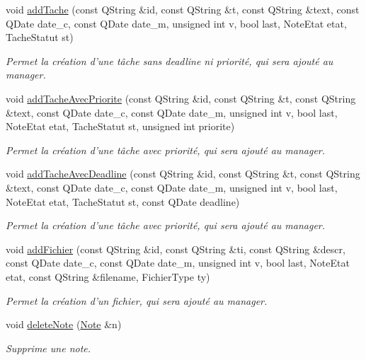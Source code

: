 \begin{DoxyCompactItemize}
void \hyperlink{class_notes_manager_a6fd74614ecebdd7ca8c62abce57ed09b}{add\-Tache} (const Q\-String \&id, const Q\-String \&t, const Q\-String \&text, const Q\-Date date\-\_\-c, const Q\-Date date\-\_\-m, unsigned int v, bool last, Note\-Etat etat, Tache\-Statut st)
\begin{DoxyCompactList}\small\item\em Permet la création d'une tâche sans deadline ni priorité, qui sera ajouté au manager. \end{DoxyCompactList}\item 
void \hyperlink{class_notes_manager_ad4826ba011a506bf26d2cfc10b5d6669}{add\-Tache\-Avec\-Priorite} (const Q\-String \&id, const Q\-String \&t, const Q\-String \&text, const Q\-Date date\-\_\-c, const Q\-Date date\-\_\-m, unsigned int v, bool last, Note\-Etat etat, Tache\-Statut st, unsigned int priorite)
\begin{DoxyCompactList}\small\item\em Permet la création d'une tâche avec priorité, qui sera ajouté au manager. \end{DoxyCompactList}\item 
void \hyperlink{class_notes_manager_add166f20b086988d3da1b09ca86bd40f}{add\-Tache\-Avec\-Deadline} (const Q\-String \&id, const Q\-String \&t, const Q\-String \&text, const Q\-Date date\-\_\-c, const Q\-Date date\-\_\-m, unsigned int v, bool last, Note\-Etat etat, Tache\-Statut st, const Q\-Date deadline)
\begin{DoxyCompactList}\small\item\em Permet la création d'une tâche avec priorité, qui sera ajouté au manager. \end{DoxyCompactList}\item 
void \hyperlink{class_notes_manager_aa0adc74c7a41690ad1a361a4f744c353}{add\-Fichier} (const Q\-String \&id, const Q\-String \&ti, const Q\-String \&descr, const Q\-Date date\-\_\-c, const Q\-Date date\-\_\-m, unsigned int v, bool last, Note\-Etat etat, const Q\-String \&filename, Fichier\-Type ty)
\begin{DoxyCompactList}\small\item\em Permet la création d'un fichier, qui sera ajouté au manager. \end{DoxyCompactList}\item 
void \hyperlink{class_notes_manager_a29d032aae2c5c2a95bbd11c8345f05e5}{delete\-Note} (\hyperlink{class_note}{Note} \&n)
\begin{DoxyCompactList}\small\item\em Supprime une note. \end{DoxyCompactList}\item 

\end{DoxyCompactItemize}
